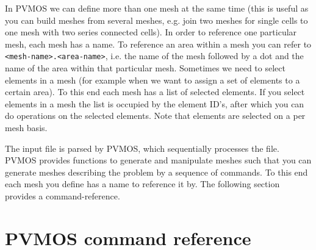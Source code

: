 \documentclass[noshowpacs,preprintnumbers,amsmath,amssymb, letter]{revtex4}
\begin{document}
In PVMOS we can define more than one mesh at the same time (this is useful as you can build meshes from several meshes, e.g. join two meshes for single cells to one mesh with two series connected cells). In order to reference one particular mesh, each mesh has a name. To reference an area within a mesh you can refer to \texttt{<mesh-name>.<area-name>}, i.e. the name of the mesh followed by a dot and the name of the area within that particular mesh. Sometimes we need to select elements in a mesh (for example when we want to assign a set of elements to a certain area). To this end each mesh has a list of selected elements. If you select elements in a mesh the list is occupied by the element ID's, after which you can do operations on the selected elements. Note that elements are selected on a per mesh basis. 

The input file is parsed by PVMOS, which sequentially processes the file. PVMOS provides functions to generate and manipulate meshes such that you can generate meshes describing the problem by a sequence of commands. To this end each mesh you define has a name to reference it by. The following section provides a command-reference.

\section{\label{syntax}PVMOS command reference}
\end{document}
